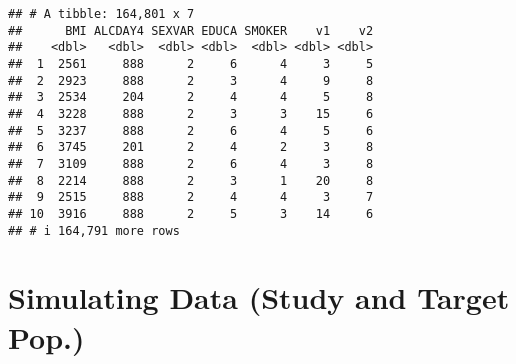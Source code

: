 \documentclass[
]{article}
\begin{document}
\begin{verbatim}
## # A tibble: 164,801 x 7
##      BMI ALCDAY4 SEXVAR EDUCA SMOKER    v1    v2
##    <dbl>   <dbl>  <dbl> <dbl>  <dbl> <dbl> <dbl>
##  1  2561     888      2     6      4     3     5
##  2  2923     888      2     3      4     9     8
##  3  2534     204      2     4      4     5     8
##  4  3228     888      2     3      3    15     6
##  5  3237     888      2     6      4     5     6
##  6  3745     201      2     4      2     3     8
##  7  3109     888      2     6      4     3     8
##  8  2214     888      2     3      1    20     8
##  9  2515     888      2     4      4     3     7
## 10  3916     888      2     5      3    14     6
## # i 164,791 more rows
\end{verbatim}

\section{Simulating Data (Study and Target
Pop.)}\label{simulating-data-study-and-target-pop.}
\end{document}
